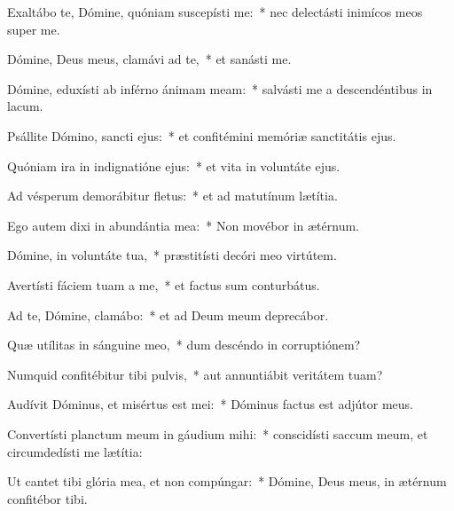 \item Exaltábo te, Dómine, quóniam suscepísti me:~* nec delectásti inimícos meos super me.

\item Dómine, Deus meus, clamávi ad te,~* et sanásti me.

\item Dómine, eduxísti ab inférno ánimam meam:~* salvásti me a descendéntibus in lacum.

\item Psállite Dómino, sancti ejus:~* et confitémini memóriæ sanctitátis ejus.

\item Quóniam ira in indignatióne ejus:~* et vita in voluntáte ejus.

\item Ad vésperum demorábitur fletus:~* et ad matutínum lætítia.

\item Ego autem dixi in abundántia mea:~* Non movébor in ætérnum.

\item Dómine, in voluntáte tua,~* præstitísti decóri meo virtútem.

\item Avertísti fáciem tuam a me,~* et factus sum conturbátus.

\item Ad te, Dómine, clamábo:~* et ad Deum meum deprecábor.

\item Quæ utílitas in sánguine meo,~* dum descéndo in corruptiónem?

\item Numquid confitébitur tibi pulvis,~* aut annuntiábit veritátem tuam?

\item Audívit Dóminus, et misértus est mei:~* Dóminus factus est adjútor meus.

\item Convertísti planctum meum in gáudium mihi:~* conscidísti saccum meum, et circumdedísti me lætítia:

\item Ut cantet tibi glória mea, et non compúngar:~* Dómine, Deus meus, in ætérnum confitébor tibi.


